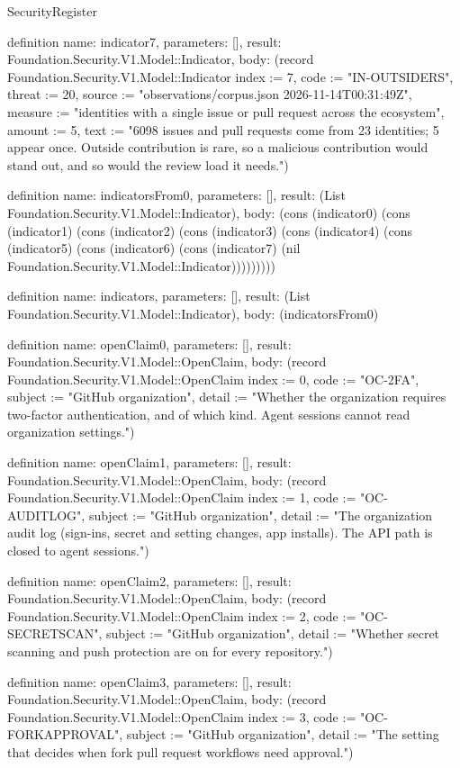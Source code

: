 \begin{lexlean}{SecurityRegister}
\begin{semanticmodule}
definition{
  name: indicator7,
  parameters: [],
  result: Foundation.Security.V1.Model::Indicator,
  body: (record Foundation.Security.V1.Model::Indicator {index := 7, code := "IN-OUTSIDERS", threat := 20, source := "observations/corpus.json 2026-11-14T00:31:49Z", measure := "identities with a single issue or pull request across the ecosystem", amount := 5, text := "6098 issues and pull requests come from 23 identities; 5 appear once. Outside contribution is rare, so a malicious contribution would stand out, and so would the review load it needs."})
}

definition{
  name: indicatorsFrom0,
  parameters: [],
  result: (List Foundation.Security.V1.Model::Indicator),
  body: (cons (indicator0) (cons (indicator1) (cons (indicator2) (cons (indicator3) (cons (indicator4) (cons (indicator5) (cons (indicator6) (cons (indicator7) (nil Foundation.Security.V1.Model::Indicator)))))))))
}

definition{
  name: indicators,
  parameters: [],
  result: (List Foundation.Security.V1.Model::Indicator),
  body: (indicatorsFrom0)
}

definition{
  name: openClaim0,
  parameters: [],
  result: Foundation.Security.V1.Model::OpenClaim,
  body: (record Foundation.Security.V1.Model::OpenClaim {index := 0, code := "OC-2FA", subject := "GitHub organization", detail := "Whether the organization requires two-factor authentication, and of which kind. Agent sessions cannot read organization settings."})
}

definition{
  name: openClaim1,
  parameters: [],
  result: Foundation.Security.V1.Model::OpenClaim,
  body: (record Foundation.Security.V1.Model::OpenClaim {index := 1, code := "OC-AUDITLOG", subject := "GitHub organization", detail := "The organization audit log (sign-ins, secret and setting changes, app installs). The API path is closed to agent sessions."})
}

definition{
  name: openClaim2,
  parameters: [],
  result: Foundation.Security.V1.Model::OpenClaim,
  body: (record Foundation.Security.V1.Model::OpenClaim {index := 2, code := "OC-SECRETSCAN", subject := "GitHub organization", detail := "Whether secret scanning and push protection are on for every repository."})
}

definition{
  name: openClaim3,
  parameters: [],
  result: Foundation.Security.V1.Model::OpenClaim,
  body: (record Foundation.Security.V1.Model::OpenClaim {index := 3, code := "OC-FORKAPPROVAL", subject := "GitHub organization", detail := "The setting that decides when fork pull request workflows need approval."})
}


\end{semanticmodule}
\end{lexlean}
